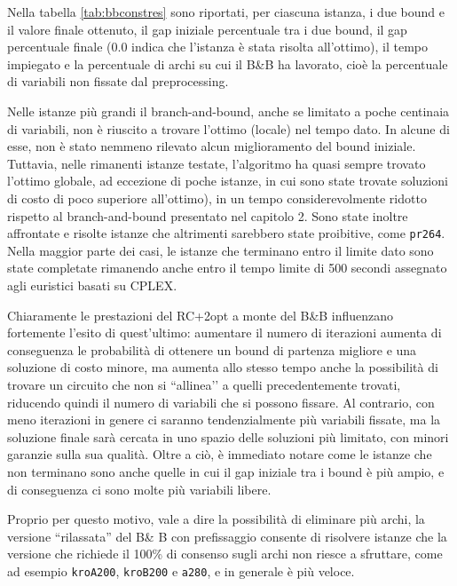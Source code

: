 Nella tabella \ref{tab:bbconstres} sono riportati, per ciascuna istanza, i due bound e il valore finale ottenuto, il gap iniziale percentuale tra i due bound, il gap percentuale finale ($0.0$ indica che l'istanza è stata risolta all'ottimo), il tempo impiegato e la percentuale di archi su cui il B\&B ha lavorato, cioè la percentuale di variabili non fissate dal preprocessing.

Nelle istanze più grandi il branch-and-bound, anche se limitato a poche centinaia di variabili, non è riuscito a trovare l’ottimo (locale) nel tempo dato. In alcune di esse, non è stato nemmeno rilevato alcun miglioramento del bound iniziale. Tuttavia, nelle rimanenti istanze testate, l’algoritmo ha quasi sempre trovato l’ottimo globale, ad eccezione di poche istanze, in cui sono state trovate soluzioni di costo di poco superiore all’ottimo), in un tempo considerevolmente ridotto rispetto al branch-and-bound presentato nel capitolo 2. Sono state inoltre affrontate e risolte istanze che altrimenti sarebbero state proibitive, come \texttt{pr264}. Nella maggior parte dei casi, le istanze che terminano entro il limite dato sono state completate rimanendo anche entro il tempo limite di 500 secondi assegnato agli euristici basati su CPLEX.

Chiaramente le prestazioni del RC+2opt a monte del B\&B influenzano fortemente l’esito di quest’ultimo: aumentare il numero di iterazioni aumenta di conseguenza le probabilità di ottenere un bound di partenza migliore e una soluzione di costo minore, ma aumenta allo stesso tempo anche la possibilità di trovare un circuito che non si ``allinea’’ a quelli precedentemente trovati, riducendo quindi il numero di variabili che si possono fissare. Al contrario, con meno iterazioni in genere ci saranno tendenzialmente più variabili fissate, ma la soluzione finale sarà cercata in uno spazio delle soluzioni più limitato, con minori garanzie sulla sua qualità. Oltre a ciò, è immediato notare come le istanze che non terminano sono anche quelle in cui il gap iniziale tra i bound è più ampio, e di conseguenza ci sono molte più variabili libere.

Proprio per questo motivo, vale a dire la possibilità di eliminare più archi, la versione ``rilassata'' del B\& B con prefissaggio consente di risolvere istanze che la versione che richiede il 100\% di consenso sugli archi non riesce a sfruttare, come ad esempio \texttt{kroA200}, \texttt{kroB200} e \texttt{a280}, e in generale è più veloce.

